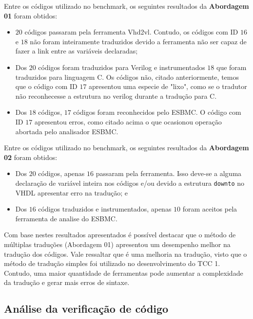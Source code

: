 \par
Entre os códigos utilizado no benchmark, os seguintes resultados da \textbf{Abordagem 01} foram obtidos:
\begin{itemize}
    \item $20$ códigos passaram pela ferramenta Vhd2vl. Contudo, os códigos com ID $16$ e $18$ não foram inteiramente traduzidos devido a ferramenta não ser capaz de fazer a link entre as variáveis declaradas; 
    \item Dos $20$ códigos foram traduzidos para Verilog e instrumentados $18$ que foram traduzidos para linguagem C. Os códigos não, citado anteriormente, temos que o código com ID $17$ apresentou uma especie de "lixo", como se o tradutor não reconhecesse a estrutura no verilog durante a tradução para C.
    \item Dos $18$ códigos, $17$ códigos foram reconhecidos pelo ESBMC. O código com ID $17$ apresentou erros, como citado acima o que ocasionou operação abortada pelo analisador ESBMC.
\end{itemize}

\par
Entre os códigos utilizado no benchmark, os seguintes resultados da \textbf{Abordagem 02} foram obtidos:
\begin{itemize}
    \item Dos $20$ códigos, apenas $16$ passaram pela ferramenta. Isso deve-se a alguma declaração de variável inteira nos códigos e/ou devido a estrutura \texttt{downto} no VHDL apresentar erro na tradução; e
    \item Dos $16$ códigos traduzidos e instrumentados, apenas $10$ foram aceitos pela ferramenta de analise do ESBMC.
\end{itemize}

Com base nestes resultados apresentados é possível destacar que o método de múltiplas traduções (Abordagem 01) apresentou um desempenho melhor na tradução dos códigos. Vale ressaltar que é uma melhoria na tradução, visto que o método de tradução simples foi utilizado no desenvolvimento do TCC 1. Contudo, uma maior quantidade de ferramentas pode aumentar a complexidade da tradução e gerar mais erros de sintaxe.

\subsection{Análise da verificação de código}

